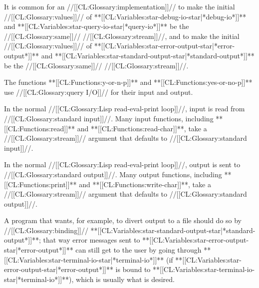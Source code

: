 It is common for an //[[CL:Glossary:implementation]]// to make the initial //[[CL:Glossary:values]]// of **[[CL:Variables:star-debug-io-star|*debug-io*]]** and **[[CL:Variables:star-query-io-star|*query-io*]]** be the //[[CL:Glossary:same]]// //[[CL:Glossary:stream]]//, and to make the initial //[[CL:Glossary:values]]// of **[[CL:Variables:star-error-output-star|*error-output*]]** and **[[CL:Variables:star-standard-output-star|*standard-output*]]** be the //[[CL:Glossary:same]]// //[[CL:Glossary:stream]]//.

The functions **[[CL:Functions:y-or-n-p]]** and **[[CL:Functions:yes-or-no-p]]** use //[[CL:Glossary:query I/O]]// for their input and output.

In the normal //[[CL:Glossary:Lisp read-eval-print loop]]//, input is read from //[[CL:Glossary:standard input]]//. Many input functions, including **[[CL:Functions:read]]** and **[[CL:Functions:read-char]]**, take a //[[CL:Glossary:stream]]// argument that defaults to //[[CL:Glossary:standard input]]//.

In the normal //[[CL:Glossary:Lisp read-eval-print loop]]//, output is sent to //[[CL:Glossary:standard output]]//. Many output functions, including **[[CL:Functions:print]]** and **[[CL:Functions:write-char]]**, take a //[[CL:Glossary:stream]]// argument that defaults to //[[CL:Glossary:standard output]]//.

A program that wants, for example, to divert output to a file should do so by //[[CL:Glossary:binding]]// **[[CL:Variables:star-standard-output-star|*standard-output*]]**; that way error messages sent to **[[CL:Variables:star-error-output-star|*error-output*]]** can still get to the user by going through **[[CL:Variables:star-terminal-io-star|*terminal-io*]]** (if **[[CL:Variables:star-error-output-star|*error-output*]]** is bound to **[[CL:Variables:star-terminal-io-star|*terminal-io*]]**), which is usually what is desired.

 
